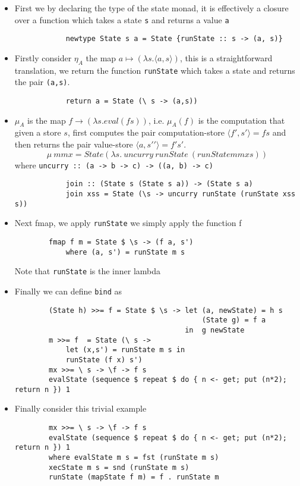 \begin{itemize}
    \item First we by declaring the type of the state monad,
        it is effectively a closure over a function
        which takes a state \texttt{s} and returns a value \texttt{a}
        \begin{verbatim}
            newtype State s a = State {runState :: s -> (a, s)}
        \end{verbatim}
    \item Firstly consider $\eta_A$
        the map $a \mapsto (\lambda s.\langle a,s \rangle)$,
        this is a straightforward translation,
        we return the function \texttt{runState} which
        takes a state and returns the pair \texttt{(a,s)}.
        \begin{verbatim}
            return a = State (\ s -> (a,s))
        \end{verbatim}
    \item $\mu_A$ is the map $f \rightarrow (\lambda s.eval(fs))$,
    i.e. $\mu_A(f)$ is the computation that given a store $s$,
    first computes the pair computation-store $\langle f\prime,s\prime\rangle = fs$
    and then returns the pair value-store $\langle a,s\prime\prime\rangle = f\prime s\prime$.
    $$\mu\ mmx = State (\lambda s.\ uncurry\ runState\ (runState mmx s))$$
    where \texttt{uncurry :: (a -> b -> c) -> ((a, b) -> c)}
        \begin{verbatim}
            join :: (State s (State s a)) -> (State s a)
            join xss = State (\s -> uncurry runState (runState xss s))
        \end{verbatim}
    \item Next fmap,
        we apply \texttt{runState}
        we simply apply the function f
        \begin{verbatim}
        fmap f m = State $ \s -> (f a, s')
            where (a, s') = runState m s
        \end{verbatim}
        Note that \texttt{runState} is the inner lambda
    \item Finally we can define \texttt{bind} as
    \begin{verbatim}
        (State h) >>= f = State $ \s -> let (a, newState) = h s
                                            (State g) = f a
                                        in  g newState
        m >>= f  = State (\ s ->
            let (x,s') = runState m s in
            runState (f x) s')
        mx >>= \ s -> \f -> f s
        evalState (sequence $ repeat $ do { n <- get; put (n*2); return n }) 1
    \end{verbatim}
    \item Finally consider this trivial example
    \begin{verbatim}
        mx >>= \ s -> \f -> f s
        evalState (sequence $ repeat $ do { n <- get; put (n*2); return n }) 1
        where evalState m s = fst (runState m s)
        xecState m s = snd (runState m s)
        runState (mapState f m) = f . runState m
    \end{verbatim}
\end{itemize}

